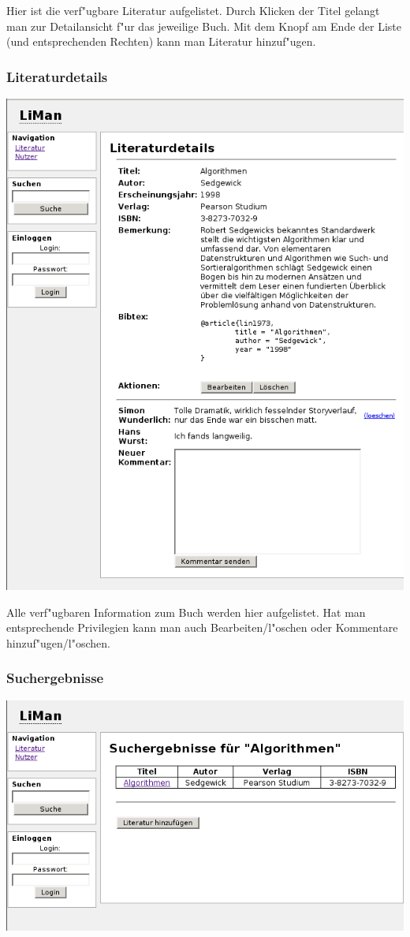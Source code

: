 Hier ist die verf"ugbare Literatur aufgelistet. Durch Klicken der Titel gelangt man zur Detailansicht f"ur 
das jeweilige Buch. Mit dem Knopf am Ende der Liste (und entsprechenden Rechten) kann man Literatur hinzuf"ugen.

\subsubsection{Literaturdetails}
\includegraphics[scale=0.6]{lit.png}

Alle verf"ugbaren Information zum Buch werden hier aufgelistet. Hat man entsprechende Privilegien kann man auch
Bearbeiten/l"oschen oder Kommentare hinzuf"ugen/l"oschen.

\subsubsection{Suchergebnisse}
\includegraphics[scale=0.6]{search.png}

